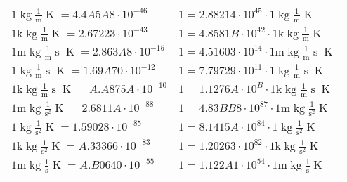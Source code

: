 \begin{center}
\begin{longtable}{l l}
{\color{black}$1 \bm{\mathrm{ }}\operatorname{kg}\frac1{\operatorname{m}}{}{}{\operatorname{K}} = 4.4A5A8\cdot10^{-46} $}   & {\color{black}$ 1 = 2.88214\cdot10^{45} \cdot 1 \bm{\mathrm{ }}\operatorname{kg}\frac1{\operatorname{m}}{}{}{\operatorname{K}}$}  \\
{\color{gray}$1 \bm{\mathrm{ k}}\operatorname{kg}\frac1{\operatorname{m}}{}{}{\operatorname{K}} = 2.67223\cdot10^{-43} $}   & {\color{gray}$ 1 = 4.8581B\cdot10^{42} \cdot 1 \bm{\mathrm{ k}}\operatorname{kg}\frac1{\operatorname{m}}{}{}{\operatorname{K}}$}  \\
{\color{gray}$1 \bm{\mathrm{ m}}\operatorname{kg}\frac1{\operatorname{m}}{\operatorname{s}}{}{\operatorname{K}} = 2.863A8\cdot10^{-15} $}   & {\color{gray}$ 1 = 4.51603\cdot10^{14} \cdot 1 \bm{\mathrm{ m}}\operatorname{kg}\frac1{\operatorname{m}}{\operatorname{s}}{}{\operatorname{K}}$}  \\
{\color{black}$1 \bm{\mathrm{ }}\operatorname{kg}\frac1{\operatorname{m}}{\operatorname{s}}{}{\operatorname{K}} = 1.69A70\cdot10^{-12} $}   & {\color{black}$ 1 = 7.79729\cdot10^{11} \cdot 1 \bm{\mathrm{ }}\operatorname{kg}\frac1{\operatorname{m}}{\operatorname{s}}{}{\operatorname{K}}$}  \\
{\color{gray}$1 \bm{\mathrm{ k}}\operatorname{kg}\frac1{\operatorname{m}}{\operatorname{s}}{}{\operatorname{K}} = A.A875A\cdot10^{-10} $}   & {\color{gray}$ 1 = 1.1276A\cdot10^{B} \cdot 1 \bm{\mathrm{ k}}\operatorname{kg}\frac1{\operatorname{m}}{\operatorname{s}}{}{\operatorname{K}}$}  \\
{\color{gray}$1 \bm{\mathrm{ m}}\operatorname{kg}{}\frac1{\operatorname{s}^2}{}{\operatorname{K}} = 2.6811A\cdot10^{-88} $}   & {\color{gray}$ 1 = 4.83BB8\cdot10^{87} \cdot 1 \bm{\mathrm{ m}}\operatorname{kg}{}\frac1{\operatorname{s}^2}{}{\operatorname{K}}$}  \\
{\color{black}$1 \bm{\mathrm{ }}\operatorname{kg}{}\frac1{\operatorname{s}^2}{}{\operatorname{K}} = 1.59028\cdot10^{-85} $}   & {\color{black}$ 1 = 8.1415A\cdot10^{84} \cdot 1 \bm{\mathrm{ }}\operatorname{kg}{}\frac1{\operatorname{s}^2}{}{\operatorname{K}}$}  \\
{\color{gray}$1 \bm{\mathrm{ k}}\operatorname{kg}{}\frac1{\operatorname{s}^2}{}{\operatorname{K}} = A.33366\cdot10^{-83} $}   & {\color{gray}$ 1 = 1.20263\cdot10^{82} \cdot 1 \bm{\mathrm{ k}}\operatorname{kg}{}\frac1{\operatorname{s}^2}{}{\operatorname{K}}$}  \\
{\color{gray}$1 \bm{\mathrm{ m}}\operatorname{kg}{}\frac1{\operatorname{s}}{}{\operatorname{K}} = A.B0640\cdot10^{-55} $}   & {\color{gray}$ 1 = 1.122A1\cdot10^{54} \cdot 1 \bm{\mathrm{ m}}\operatorname{kg}{}\frac1{\operatorname{s}}{}{\operatorname{K}}$}  \\

\end{longtable}
\end{center}
